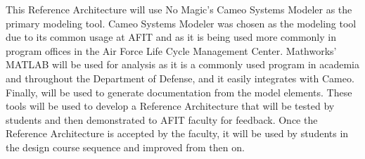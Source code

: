 This Reference Architecture will use No Magic's Cameo Systems Modeler as the primary modeling tool. Cameo Systems Modeler was chosen as the modeling tool due to its common usage at AFIT and as it is being used more commonly in program offices in the Air Force Life Cycle Management Center. Mathworks' MATLAB will be used for analysis as it is a commonly used program in academia and throughout the Department of Defense, and it easily integrates with Cameo. Finally,  will be used to generate documentation from the model elements. These tools will be used to develop a Reference Architecture that will be tested by students and then demonstrated to AFIT faculty for feedback. Once the Reference Architecture is accepted by the faculty, it will be used by students in the design course sequence and improved from then on. 